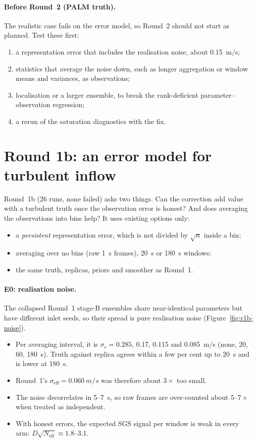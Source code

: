 \documentclass[11pt,a4paper]{article}
\newcommand{\seff}{\ensuremath{\sigma_{\mathrm{eff}}}}
\begin{document}
\paragraph{Before Round~2 (PALM truth).}
The realistic case fails on the error model, so Round~2 should not start as
planned. Test these first:
\begin{enumerate}
\item a representation error that includes the realisation noise, about
  \SI{0.15}{m/s};
\item statistics that average the noise down, such as longer aggregation or
  window means and variances, as observations;
\item localisation or a larger ensemble, to break the rank-deficient
  parameter--observation regression;
\item a rerun of the saturation diagnostics with the fix.
\end{enumerate}

\FloatBarrier
\section{Round 1b: an error model for turbulent inflow}
\label{sec:r1b}

Round~1b (26 runs, none failed) asks two things. Can the correction add value
with a turbulent truth once the observation error is honest? And does
averaging the observations into bins help? It uses existing options only:
\begin{itemize}
\item a \emph{persistent} representation error, which is not divided by
  $\sqrt n$ inside a bin;
\item averaging over no bins (raw \SI{1}{s} frames), \SI{20}{s} or
  \SI{180}{s} windows;
\item the same truth, replicas, priors and smoother as Round~1.
\end{itemize}

\paragraph{E0: realisation noise.}
The collapsed Round~1 stage-B ensembles share near-identical parameters but
have different inlet seeds, so their spread is pure realisation noise
(Figure~\ref{fig:r1b-noise}).
\begin{itemize}
\item Per averaging interval, it is $\sigma_r=0.285$, 0.17, 0.115 and
  \SI{0.085}{m/s} (none, 20, 60, \SI{180}{s}). Truth against replica agrees
  within a few per cent up to \SI{20}{s} and is lower at \SI{180}{s}.
\item Round~1's $\seff=\SI{0.060}{m/s}$ was therefore about $3\times$ too
  small.
\item The noise decorrelates in 5--\SI{7}{s}, so raw frames are over-counted
  about $5$--$7\times$ when treated as independent.
\item With honest errors, the expected SGS signal per window is weak in
  every arm: $D\sqrt{N_\mathrm{eff}}\approx1.8$--3.1.
\end{itemize}
\end{document}
